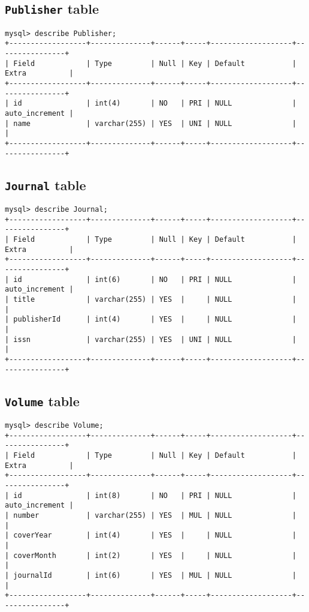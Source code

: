 
{\small
\subsection{{\tt Publisher} table}
\begin{verbatim}
mysql> describe Publisher;
+------------------+--------------+------+-----+-------------------+----------------+
| Field            | Type         | Null | Key | Default           | Extra          |
+------------------+--------------+------+-----+-------------------+----------------+
| id               | int(4)       | NO   | PRI | NULL              | auto_increment | 
| name             | varchar(255) | YES  | UNI | NULL              |                | 
+------------------+--------------+------+-----+-------------------+----------------+
\end{verbatim}


\subsection{{\tt Journal} table}
\begin{verbatim}
mysql> describe Journal;
+------------------+--------------+------+-----+-------------------+----------------+
| Field            | Type         | Null | Key | Default           | Extra          |
+------------------+--------------+------+-----+-------------------+----------------+
| id               | int(6)       | NO   | PRI | NULL              | auto_increment | 
| title            | varchar(255) | YES  |     | NULL              |                | 
| publisherId      | int(4)       | YES  |     | NULL              |                |  
| issn             | varchar(255) | YES  | UNI | NULL              |                |  
+------------------+--------------+------+-----+-------------------+----------------+
\end{verbatim}

\subsection{{\tt Volume} table}
\begin{verbatim}
mysql> describe Volume;
+------------------+--------------+------+-----+-------------------+----------------+
| Field            | Type         | Null | Key | Default           | Extra          |
+------------------+--------------+------+-----+-------------------+----------------+
| id               | int(8)       | NO   | PRI | NULL              | auto_increment | 
| number           | varchar(255) | YES  | MUL | NULL              |                | 
| coverYear        | int(4)       | YES  |     | NULL              |                | 
| coverMonth       | int(2)       | YES  |     | NULL              |                | 
| journalId        | int(6)       | YES  | MUL | NULL              |                | 
+------------------+--------------+------+-----+-------------------+----------------+
\end{verbatim}

}
